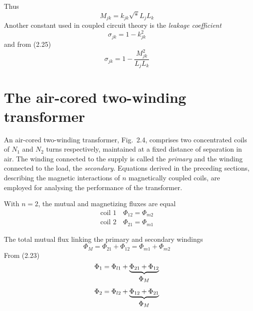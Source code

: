 \documentclass[a4paper,numbers=noenddot,12pt]{scrbook}
\begin{document}
        Thus
        \begin{equation}
            M_{jk} = k_{jk} \sqrt* L_j L_k
            \label{eq:Eq2.25}
        \end{equation}
        Another constant used in coupled circuit theory is the \textit{leakage coefficient}
        \begin{equation}
            \sigma_{jk} = 1 - k_{jk}^2
            \label{eq:Eq2.26}
        \end{equation}
        and from (2.25)
        \begin{equation}
            \sigma_{jk} = 1 - \dfrac{M_{jk}^2}{L_j L_k}
            \label{eq:Eq2.27}
        \end{equation}

        \section{The air-cored two-winding transformer}
        An air-cored two-winding transformer, Fig.\ 2.4, comprises two concentrated coils of $N_1$ and $N_2$ turns respectively, maintained at a fixed distance of separation in air. The winding connected to the supply is called the \textit{primary} and the winding connected to the load, the \textit{secondary}. Equations derived in the preceding sections, describing the magnetic interactions of $n$ magnetically coupled coils, are employed for analysing the performance of the transformer.

        With $n = 2$, the mutual and magnetizing fluxes are equal
        \begin{equation}
            \begin{aligned}
                \text{coil 1}\quad \Phi_{12} = \Phi_{m2} \\
                \text{coil 2}\quad \Phi_{21} = \Phi_{m1} 
            \end{aligned}
            \label{eq:Eq2.28}
        \end{equation}

        The total mutual flux linking the primary and secondary windings
        \begin{equation}
            \Phi_M = \Phi_{21} + \Phi_{12} = \Phi_{m1} + \Phi_{m2}
            \label{eq:Eq2.29}
        \end{equation}
        From (2.23)
        \begin{equation}
            \Phi_1 = \Phi_{l1} + \underbrace{\Phi_{21} + \Phi_{12}}_{%
                \begin{gathered}
                    \Phi_M
                \end{gathered}}
                \label{eq:Eq2.30}
            \end{equation}
            \begin{equation}
                \Phi_2 = \Phi_{l2} + \underbrace{\Phi_{12} + \Phi_{21}}_{%
                    \begin{gathered}
                        \Phi_M
                    \end{gathered}}
                    \label{eq:Eq2.31}
                \end{equation}
\end{document}

